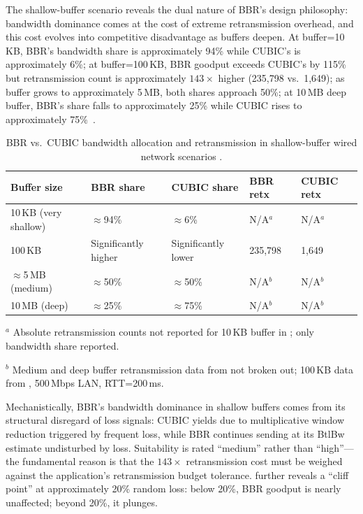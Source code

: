 \documentclass[a4paper,fleqn]{cas-sc}
\begin{document}
The shallow-buffer scenario reveals the dual nature of BBR's design philosophy:
bandwidth dominance comes at the cost of extreme retransmission overhead, and
this cost evolves into competitive disadvantage as buffers deepen. At
buffer=10\,KB, BBR's bandwidth share is approximately 94\% while CUBIC's is
approximately 6\%; at buffer=100\,KB, BBR goodput exceeds CUBIC's by 115\% but
retransmission count is approximately $143\times$ higher (235,798 vs.\ 1,649);
as buffer grows to approximately 5\,MB, both shares approach 50\%; at 10\,MB
deep buffer, BBR's share falls to approximately 25\% while CUBIC rises to
approximately 75\%~\citep{cao2019bbr,jaeger2019bbr}.

\begin{table}[pos=htbp]
  \caption{BBR vs.\ CUBIC bandwidth allocation and retransmission in shallow-buffer
    wired network scenarios
    \citep{cao2019bbr,jaeger2019bbr}.}
  \label{tab:shallow}
  \small
  \begin{threeparttable}
  \begin{tabularx}{\tblwidth}{@{}lXXXX@{}}
    \toprule
    \textbf{Buffer size} & \textbf{BBR share} & \textbf{CUBIC share}
      & \textbf{BBR retx} & \textbf{CUBIC retx} \\
    \midrule
    10\,KB (very shallow) & $\approx$94\% & $\approx$6\%  & N/A$^{a}$ & N/A$^{a}$ \\
    100\,KB               & Significantly higher & Significantly lower & 235,798 & 1,649 \\
    $\approx$5\,MB (medium)& $\approx$50\% & $\approx$50\% & N/A$^{b}$ & N/A$^{b}$ \\
    10\,MB (deep)         & $\approx$25\% & $\approx$75\% & N/A$^{b}$ & N/A$^{b}$ \\
    \bottomrule
  \end{tabularx}
  \begin{tablenotes}
    \small
    \item $^{a}$ Absolute retransmission counts not reported for 10\,KB buffer in
    \citet{cao2019bbr}; only bandwidth share reported.
    \item $^{b}$ Medium and deep buffer retransmission data from \citet{jaeger2019bbr}
    not broken out; 100\,KB data from \citet{cao2019bbr}, 500\,Mbps LAN, RTT=200\,ms.
  \end{tablenotes}
  \end{threeparttable}
\end{table}

Mechanistically, BBR's bandwidth dominance in shallow buffers comes from its
structural disregard of loss signals: CUBIC yields due to multiplicative window
reduction triggered by frequent loss, while BBR continues sending at its BtlBw
estimate undisturbed by loss. Suitability is rated ``medium'' rather than
``high''---the fundamental reason is that the $143\times$ retransmission cost
must be weighed against the application's retransmission budget tolerance.
\citet{cao2019bbr} further reveals a ``cliff point'' at approximately 20\% random
loss: below 20\%, BBR goodput is nearly unaffected; beyond 20\%, it plunges.
\end{document}
